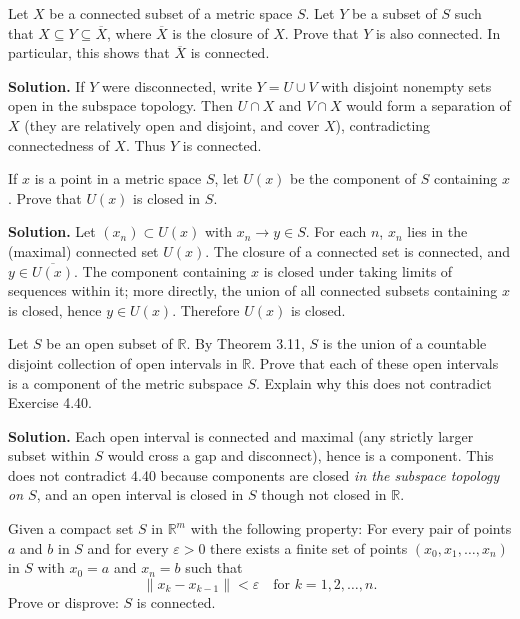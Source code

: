 \begin{problembox}
Let $X$ be a connected subset of a metric space $S$. Let $Y$ be a subset of $S$ such that $X \subseteq Y \subseteq \overline{X}$, where $\overline{X}$ is the closure of $X$. Prove that $Y$ is also connected. In particular, this shows that $\overline{X}$ is connected.
\end{problembox}

\noindent\textbf{Solution.}
If $Y$ were disconnected, write $Y=U\cup V$ with disjoint nonempty sets open in the subspace topology. Then $U\cap X$ and $V\cap X$ would form a separation of $X$ (they are relatively open and disjoint, and cover $X$), contradicting connectedness of $X$. Thus $Y$ is connected.
\medskip

\begin{problembox}
If $x$ is a point in a metric space $S$, let $U(x)$ be the component of $S$ containing $x$. Prove that $U(x)$ is closed in $S$.
\end{problembox}

\noindent\textbf{Solution.}
Let $(x_n)\subset U(x)$ with $x_n\to y\in S$. For each $n$, $x_n$ lies in the (maximal) connected set $U(x)$. The closure of a connected set is connected, and $y\in\overline{U(x)}$. The component containing $x$ is closed under taking limits of sequences within it; more directly, the union of all connected subsets containing $x$ is closed, hence $y\in U(x)$. Therefore $U(x)$ is closed.
\medskip

\begin{problembox}
Let $S$ be an open subset of $\mathbb{R}$. By Theorem 3.11, $S$ is the union of a countable disjoint collection of open intervals in $\mathbb{R}$. Prove that each of these open intervals is a component of the metric subspace $S$. Explain why this does not contradict Exercise 4.40.
\end{problembox}

\noindent\textbf{Solution.}
Each open interval is connected and maximal (any strictly larger subset within $S$ would cross a gap and disconnect), hence is a component. This does not contradict 4.40 because components are closed \emph{in the subspace topology on $S$}, and an open interval is closed in $S$ though not closed in $\mathbb{R}$.
\medskip

\begin{problembox}
Given a compact set $S$ in $\mathbb{R}^m$ with the following property: For every pair of points $a$ and $b$ in $S$ and for every $\varepsilon > 0$ there exists a finite set of points $(x_0, x_1, \ldots, x_n)$ in $S$ with $x_0 = a$ and $x_n = b$ such that
\[\|x_k - x_{k-1}\| < \varepsilon \quad \text{for } k = 1, 2, \ldots, n.\]
Prove or disprove: $S$ is connected.
\end{problembox}

